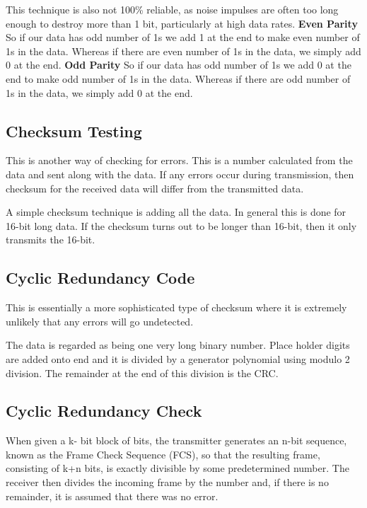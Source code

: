 \documentclass[12pt]{article}
\begin{document}
This technique is also not 100\% reliable, as noise impulses are often too long enough to destroy more than 1 bit, particularly at high data rates.
\textbf{Even Parity}
So if our data has odd number of 1s we add 1 at the end to make even number of 1s in the data.
Whereas if there are even number of 1s in the data, we simply add 0 at the end.
\textbf{Odd Parity}
So if our data has odd number of 1s we add 0 at the end to make odd number of 1s in the data.
Whereas if there are odd number of 1s in the data, we simply add 0 at the end.

\subsection{Checksum Testing}
This is another way of checking for errors. This is a number calculated from the data and sent along with the data. If any errors occur during transmission, then checksum for the received data will differ from the transmitted data.

A simple checksum technique is adding all the data. In general this is done for 16-bit long data. If the checksum turns out to be longer than 16-bit, then it only transmits the 16-bit.


\subsection{Cyclic Redundancy Code} 
This is essentially a more sophisticated type of checksum where it is extremely unlikely that any errors will go undetected. 

The data is regarded as being one very long binary number. Place holder digits are added onto end and it is divided by a generator polynomial using modulo 2 division. The remainder at the end of this division is the CRC.

\subsection{Cyclic Redundancy Check}
When given a k- bit block of bits, the transmitter generates an n-bit sequence, known as the Frame Check Sequence (FCS), so that the resulting frame, consisting of k+n bits, is exactly divisible by some predetermined number. The receiver then divides the incoming frame by the number and, if there is no remainder, it is assumed that there was no error. 
\end{document}
